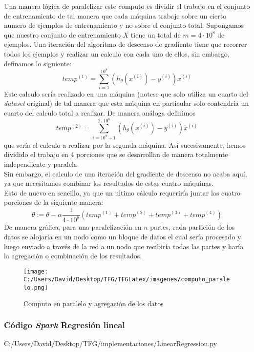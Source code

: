 \clearpage

Una manera lógica de paralelizar este computo es dividir el trabajo en el conjunto de entrenamiento 
de tal manera que cada máquina trabaje sobre un cierto numero de ejemplos de entrenamiento y no 
sobre el conjunto total.
Supongamos que nuestro conjunto de entrenamiento $X$ tiene un total de $m=4 \cdot 10^8$ de ejemplos.
Una iteración del algoritmo de descenso de gradiente tiene que recorrer todos los ejemplos y realizar 
un calculo con cada uno de ellos, sin embargo, definamos lo siguiente:
$$ temp^{(1)} = \sum_{i=1}^{10^8}(h_{\theta}(x^{(i)}) - y^{(i)})x^{(i)} $$
Este calculo sería realizado en una máquina (notese que solo utiliza un cuarto del \textit{dataset} original) 
de tal manera que esta máquina en particular solo contendría un cuarto del calculo total a realizar.
De manera análoga definimos
$$ temp^{(2)} = \sum_{i=10^8+1}^{2 \cdot 10^8}(h_{\theta}(x^{(i)}) - y^{(i)})x^{(i)} $$
que sería el calculo a realizar por la segunda máquina.
Así sucesivamente, hemos dividido el trabajo en 4 porciones que se desarrollan de manera totalmente 
independiente y paralela.\\
Sin embargo, el calculo de una iteración del gradiente de descenso no 
acaba aquí, ya que necesitamos combinar los resultados de estas cuatro máquinas.\\
Esto de nuevo en sencillo, ya que un ultimo cálculo requeriría juntar las cuatro porciones de la 
siguiente manera:
$$ \theta := \theta - \alpha \frac{1}{4 \cdot 10^8}(temp^{(1)} + temp^{(2)} + temp^{(3)} + temp^{(4)}) $$
De manera gráfica, para una paralelización en $n$ partes, cada partición de los datos se alojaría en un nodo
como un bloque de datos el cual sería procesado y luego enviado a través de la red a un nodo que recibiría
todas las partes y haría la agregación o combinación de los resultados.

\begin{figure}[h]
  \centering
  \texttt{[image: C:/Users/David/Desktop/TFG/TFGLatex/imagenes/computo\_paralelo.png]}
  \caption[División de los datos en el gradiente de descenso]
          {Computo en paralelo y agregación de los datos}
  \label{computo_paralelo}
\end{figure}

\newpage

\subsubsection*{Código \textit{Spark} Regresión lineal}

                {C:/Users/David/Desktop/TFG/implementaciones/LinearRegression.py}

